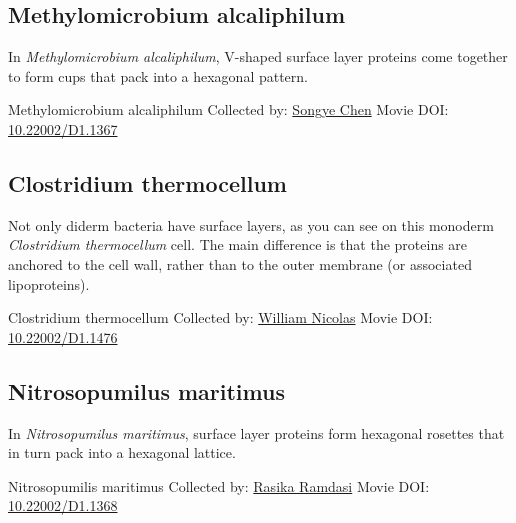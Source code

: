 \documentclass[]{tufte-book}
\begin{document}
\hypertarget{Methylomicrobium_alcaliphilum}{%
\subsection{Methylomicrobium alcaliphilum}\label{Methylomicrobium_alcaliphilum}}

In \emph{Methylomicrobium alcaliphilum}, V-shaped surface layer proteins come together to form cups that pack into a hexagonal pattern.



\hypertarget{htmlwidget-8bb6116ae8020b11c6b1}{}

\label{fig:2-7a}Methylomicrobium alcaliphilum Collected by: \protect\hyperlink{songye_chen}{Songye Chen} Movie DOI: \href{https://doi.org/10.22002/D1.1367}{10.22002/D1.1367}

\hypertarget{Clostridium_thermocellum}{%
\subsection{Clostridium thermocellum}\label{Clostridium_thermocellum}}

Not only diderm bacteria have surface layers, as you can see on this monoderm \emph{Clostridium thermocellum} cell. The main difference is that the proteins are anchored to the cell wall, rather than to the outer membrane (or associated lipoproteins).



\hypertarget{htmlwidget-1a481066967ed5c657d6}{}

\label{fig:2-7b}Clostridium thermocellum Collected by: \protect\hyperlink{william_nicolas}{William Nicolas} Movie DOI: \href{https://doi.org/10.22002/D1.1476}{10.22002/D1.1476}

\hypertarget{Nitrosopumilus_maritimus}{%
\subsection{Nitrosopumilus maritimus}\label{Nitrosopumilus_maritimus}}

In \emph{Nitrosopumilus maritimus}, surface layer proteins form hexagonal rosettes that in turn pack into a hexagonal lattice.



\hypertarget{htmlwidget-09cd172c28d15edb8a5c}{}

\label{fig:2-7c}Nitrosopumilis maritimus Collected by: \protect\hyperlink{rasika_ramdasi}{Rasika Ramdasi} Movie DOI: \href{https://doi.org/10.22002/D1.1368}{10.22002/D1.1368}
\end{document}
